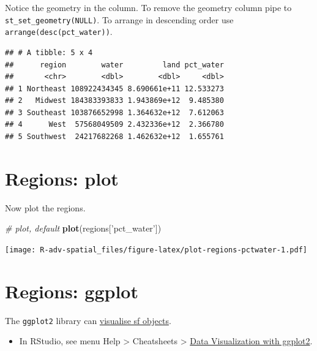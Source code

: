 \documentclass[]{book}
\newenvironment{Shaded}{\begin{snugshade}}{\end{snugshade}}
\newcommand{\KeywordTok}[1]{\textcolor[rgb]{0.13,0.29,0.53}{\textbf{{#1}}}}
\newcommand{\StringTok}[1]{\textcolor[rgb]{0.31,0.60,0.02}{{#1}}}
\newcommand{\CommentTok}[1]{\textcolor[rgb]{0.56,0.35,0.01}{\textit{{#1}}}}
\newcommand{\OtherTok}[1]{\textcolor[rgb]{0.56,0.35,0.01}{{#1}}}
\newcommand{\NormalTok}[1]{{#1}}
\providecommand{\tightlist}{%
  \setlength{\itemsep}{0pt}\setlength{\parskip}{0pt}}
\theoremstyle{definition}
\theoremstyle{definition}
\theoremstyle{definition}
\theoremstyle{remark}
\begin{document}
Notice the geometry in the column. To remove the geometry column pipe to
\texttt{st\_set\_geometry(NULL)}. To arrange in descending order use
\texttt{arrange(desc(pct\_water))}.

\begin{Shaded}
\end{Shaded}

\begin{verbatim}
## # A tibble: 5 x 4
##      region        water         land pct_water
##       <chr>        <dbl>        <dbl>     <dbl>
## 1 Northeast 108922434345 8.690661e+11 12.533273
## 2   Midwest 184383393833 1.943869e+12  9.485380
## 3 Southeast 103876652998 1.364632e+12  7.612063
## 4      West  57568049509 2.432336e+12  2.366780
## 5 Southwest  24217682268 1.462632e+12  1.655761
\end{verbatim}

\section{Regions: plot}\label{regions-plot}

Now plot the regions.

\begin{Shaded}
\begin{Highlighting}[]
\CommentTok{# plot, default}
\KeywordTok{plot}\NormalTok{(regions[}\StringTok{'pct_water'}\NormalTok{])}
\end{Highlighting}
\end{Shaded}

\texttt{[image: R-adv-spatial\_files/figure-latex/plot-regions-pctwater-1.pdf]}

\section{Regions: ggplot}\label{regions-ggplot}

The \texttt{ggplot2} library can
\href{http://ggplot2.tidyverse.org/reference/ggsf.html}{visualise sf
objects}.

\begin{itemize}
\tightlist
\item
  In RStudio, see menu Help \textgreater{} Cheatsheets \textgreater{}
  \href{https://github.com/rstudio/cheatsheets/raw/master/source/pdfs/ggplot2-cheatsheet-2.1.pdf}{Data
  Visualization with ggplot2}.
\end{itemize}
\end{document}
